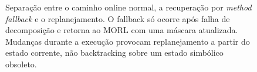 \begin{figure}[htbp]
{%
}
\caption{Separação entre o caminho online normal, a recuperação por
\emph{method fallback} e o replanejamento. O fallback só ocorre após falha de
decomposição e retorna ao MORL com uma máscara atualizada. Mudanças durante a
execução provocam replanejamento a partir do estado corrente, não backtracking
sobre um estado simbólico obsoleto.}
\label{fig:htn-morl-fallback}
\end{figure}
